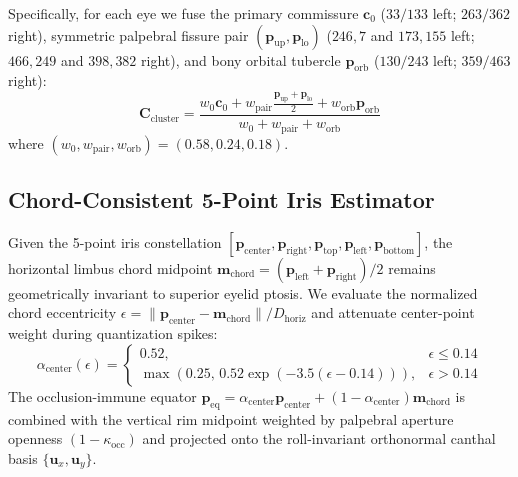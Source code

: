 \documentclass[twocolumn,10pt]{article}
\begin{document}
Specifically, for each eye we fuse the primary commissure $\mathbf{c}_0$ ($33/133$ left; $263/362$ right), symmetric palpebral fissure pair $(\mathbf{p}_{\text{up}}, \mathbf{p}_{\text{lo}})$ ($246,7$ and $173,155$ left; $466,249$ and $398,382$ right), and bony orbital tubercle $\mathbf{p}_{\text{orb}}$ ($130/243$ left; $359/463$ right):
\begin{equation}
\mathbf{C}_{\text{cluster}} = \frac{w_0 \mathbf{c}_0 + w_{\text{pair}} \frac{\mathbf{p}_{\text{up}} + \mathbf{p}_{\text{lo}}}{2} + w_{\text{orb}} \mathbf{p}_{\text{orb}}}{w_0 + w_{\text{pair}} + w_{\text{orb}}}
\end{equation}
where $(w_0, w_{\text{pair}}, w_{\text{orb}}) = (0.58, 0.24, 0.18)$.

\subsection{Chord-Consistent 5-Point Iris Estimator}
Given the 5-point iris constellation $[\mathbf{p}_{\text{center}}, \mathbf{p}_{\text{right}}, \mathbf{p}_{\text{top}}, \mathbf{p}_{\text{left}}, \mathbf{p}_{\text{bottom}}]$, the horizontal limbus chord midpoint $\mathbf{m}_{\text{chord}} = (\mathbf{p}_{\text{left}} + \mathbf{p}_{\text{right}})/2$ remains geometrically invariant to superior eyelid ptosis. We evaluate the normalized chord eccentricity $\epsilon = \|\mathbf{p}_{\text{center}} - \mathbf{m}_{\text{chord}}\| / D_{\text{horiz}}$ and attenuate center-point weight during quantization spikes:
\begin{equation}
\alpha_{\text{center}}(\epsilon) = \begin{cases} 0.52, & \epsilon \le 0.14 \\ \max\!\left(0.25,\, 0.52 \exp(-3.5(\epsilon - 0.14))\right), & \epsilon > 0.14 \end{cases}
\end{equation}
The occlusion-immune equator $\mathbf{p}_{\text{eq}} = \alpha_{\text{center}}\mathbf{p}_{\text{center}} + (1 - \alpha_{\text{center}})\mathbf{m}_{\text{chord}}$ is combined with the vertical rim midpoint weighted by palpebral aperture openness $(1 - \kappa_{\text{occ}})$ and projected onto the roll-invariant orthonormal canthal basis $\{\mathbf{u}_x, \mathbf{u}_y\}$.
\end{document}
